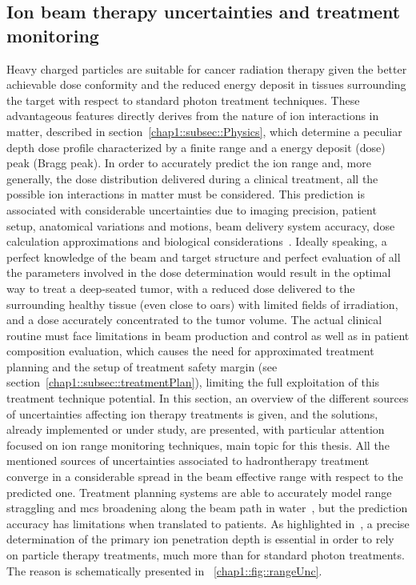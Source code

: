 \subsection{Ion beam therapy uncertainties and treatment monitoring}\label{chap1::subsec::uncertainty}
Heavy charged particles are suitable for cancer radiation therapy given the better achievable dose conformity and the reduced energy deposit in tissues surrounding the target with respect to standard photon treatment techniques. These advantageous features directly derives from the nature of ion interactions in matter, described in section~\ref{chap1::subsec::Physics}, which determine a peculiar depth dose profile characterized by a finite range and a energy deposit (dose) peak (Bragg peak). In order to accurately predict the ion range and, more generally, the dose distribution delivered during a clinical treatment, all the possible ion interactions in matter must be considered. This prediction is associated with considerable uncertainties due to imaging precision, patient setup, anatomical variations and motions, beam delivery system accuracy, dose calculation approximations and biological considerations~\parencite{Paganetti2012}. Ideally speaking, a perfect knowledge of the beam and target structure and perfect evaluation of all the parameters involved in the dose determination would result in the optimal way to treat a deep-seated tumor, with a reduced dose delivered to the surrounding healthy tissue (even close to \glspl{oar}) with limited fields of irradiation, and a dose accurately concentrated to the tumor volume. The actual clinical routine must face limitations in beam production and control as well as in patient composition evaluation, which causes the need for approximated treatment planning and the setup of treatment safety margin (see section~\ref{chap1::subsec::treatmentPlan}), limiting the full exploitation of this treatment technique potential. In this section, an overview of the different sources of uncertainties affecting ion therapy treatments is given, and the solutions, already implemented or under study, are presented, with particular attention focused on ion range monitoring techniques, main topic for this thesis.
All the mentioned sources of uncertainties associated to hadrontherapy treatment converge in a considerable spread in the beam effective range with respect to the predicted one. Treatment planning systems are able to accurately model range straggling and \gls{mcs} broadening along the beam path in water~\parencite{Hong1996}, but the prediction accuracy has limitations when translated to patients. As highlighted in~\cite{Schlegel2008}, a precise determination of the primary ion penetration depth is essential in order to rely on particle therapy treatments, much more than for standard photon treatments. The reason is schematically presented in \figurename~\ref{chap1::fig::rangeUnc}.

